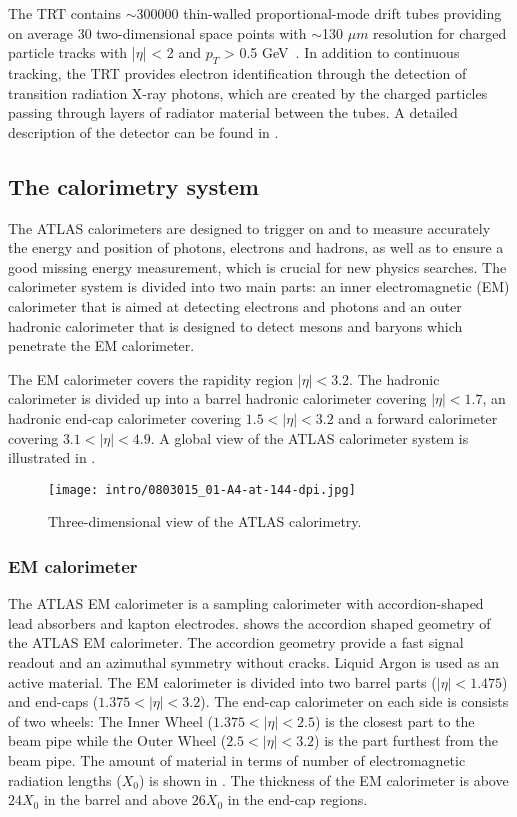 The TRT contains $\sim$300000 thin-walled proportional-mode drift tubes providing on average 30 two-dimensional 
space points with $\sim$130 $\mu m$ resolution for charged particle tracks with |$\eta$| < 2 and $p_T$ > 0.5 GeV~\cite{Abat:2008zza,Abat:2008zzb,Abat:2008zz}.
In addition to continuous tracking, the TRT provides electron identification through the detection of transition radiation X-ray photons, which are created by the charged particles passing through layers of radiator material between the tubes.
A detailed description of the detector can be found in .

\subsection{The calorimetry system}

The ATLAS calorimeters are designed to trigger on and to measure accurately the energy and position of photons, electrons and hadrons, as well as to ensure a good missing energy measurement, which is crucial for new physics searches. The calorimeter system is divided into two main parts: an inner electromagnetic (EM) calorimeter that is aimed at detecting electrons and photons and an outer hadronic calorimeter that is designed to detect mesons and baryons which penetrate the EM calorimeter.

The EM calorimeter covers the rapidity region $|\eta| < 3.2$.
The hadronic calorimeter is divided up into a barrel hadronic calorimeter covering $|\eta| < 1.7$, an hadronic end-cap calorimeter covering $1.5 < |\eta| < 3.2$ and a forward calorimeter covering $3.1 < |\eta| < 4.9$. A global view of the ATLAS calorimeter system is illustrated in .

\begin{figure}[h!]
\centering
 \texttt{[image: intro/0803015\_01-A4-at-144-dpi.jpg]}
 \caption{Three-dimensional view of the ATLAS calorimetry.}
\label{fig:Calo}
\end{figure}

\subsubsection{EM calorimeter}
The ATLAS EM calorimeter is a sampling calorimeter with accordion-shaped lead absorbers and kapton electrodes.
 shows the accordion shaped geometry of the ATLAS EM calorimeter. The accordion geometry provide a fast signal readout and an azimuthal symmetry without cracks. Liquid Argon is used as an active material. The EM calorimeter is divided into two barrel parts ($|\eta|<1.475$) and end-caps ($1.375<|\eta|<3.2$).
The end-cap calorimeter on each side is consists of two wheels: The Inner Wheel ($1.375<|\eta|<2.5$) is the closest part to the beam pipe while the
Outer Wheel ($2.5<|\eta|<3.2$) is the part furthest from the beam pipe.
The amount of material in terms of number of electromagnetic radiation lengths ($X_0$) is shown in .
The thickness of the EM calorimeter is above $24 X_0$ in the barrel and above $26 X_0$ in the end-cap regions.

